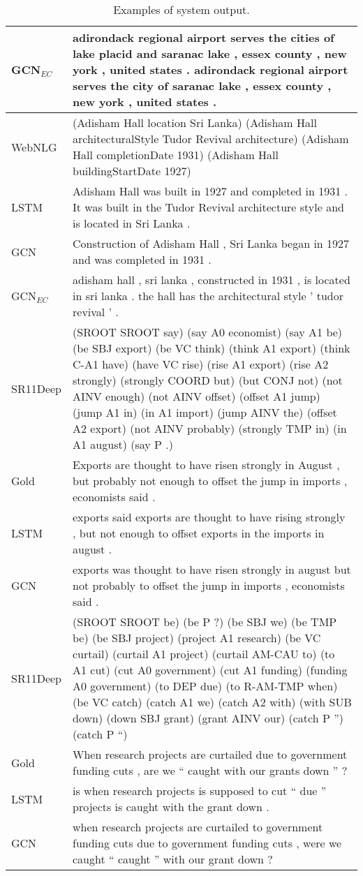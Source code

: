 \documentclass[11pt,a4paper,dvipsnames]{article}
\begin{document}
\begin{table*}[t]
\begin{small}
\begin{tabular}{|@{~}p{1.0cm}p{14.5cm}@{~}|}
  GCN$_{EC}$ & adirondack regional airport serves the cities of lake placid and saranac lake , essex county , new york , united states . adirondack regional airport serves the city of saranac lake , essex county , new york , united states .\\  
  \hline
WebNLG &  (Adisham Hall location Sri Lanka) (Adisham Hall architecturalStyle Tudor Revival architecture) (Adisham Hall completionDate 1931) (Adisham Hall buildingStartDate 1927)\\
   LSTM & Adisham Hall was built in 1927 and completed in 1931 . It was built in the Tudor Revival architecture style and is located in Sri Lanka .\\
   GCN & Construction of Adisham Hall , Sri Lanka began in 1927 and was completed in 1931 .\\
   GCN$_{EC}$ & adisham hall , sri lanka , constructed in 1931 , is located in sri lanka . the hall has the architectural style ' tudor revival ' .\\
  \hline
  \hline
SR11Deep & (SROOT SROOT say) (say A0 economist) (say A1 be) (be SBJ export) (be VC think) (think A1 export) (think C-A1 have) (have VC rise) (rise A1 export) (rise A2 strongly) (strongly COORD but) (but CONJ not) (not AINV enough) (not AINV offset) (offset A1 jump) (jump A1 in) (in A1 import) (jump AINV the) (offset A2 export) (not AINV probably) (strongly TMP in) (in A1 august) (say P .)\\
  Gold & Exports are thought to have risen strongly in August , but probably not enough to offset the jump in imports , economists said . \\
  LSTM & exports said exports are thought to have rising strongly , but not enough to offset exports in the imports in august .\\
  GCN & exports was thought to have risen strongly in august but not probably to offset the jump in imports , economists said .\\
  \hline
SR11Deep & (SROOT SROOT be) (be P ?) (be SBJ we) (be TMP be) (be SBJ project) (project A1 research) (be VC curtail) (curtail A1 project) (curtail AM-CAU to) (to A1 cut) (cut A0 government) (cut A1 funding) (funding A0 government) (to DEP due) (to R-AM-TMP when) (be VC catch) (catch A1 we) (catch A2 with) (with SUB down) (down SBJ grant) (grant AINV our) (catch P '') (catch P ``)\\
  Gold & When research projects are curtailed due to government funding cuts , are we `` caught with our grants down '' ? \\
  LSTM & is when research projects is supposed to cut `` due '' projects is caught with the grant down .\\
  GCN & when research projects are curtailed to government funding cuts due to government funding cuts , were we caught `` caught '' with our grant down ?\\  
\hline  
 \end{tabular} 
\end{small}
\vspace*{-1.5ex}
\caption{\label{tab:sys-output-additional} Examples of system output.}
\end{table*} 
\end{document}
